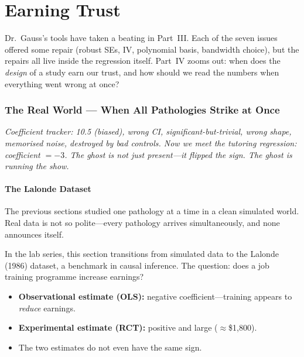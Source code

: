 \documentclass[11pt,a4paper]{article}
\theoremstyle{definition}
\theoremstyle{plain}
\theoremstyle{remark}
\begin{document}
\part{Earning Trust}\label{part:trust}

Dr.\ Gauss's tools have taken a beating in Part~III. Each of the seven issues offered some repair (robust SEs, IV, polynomial basis, bandwidth choice), but the repairs all live inside the regression itself. Part~IV zooms out: when does the \emph{design} of a study earn our trust, and how should we read the numbers when everything went wrong at once?

\section{The Real World --- When All Pathologies Strike at Once}\label{sec:realworld}

\noindent\textit{Coefficient tracker: 10.5 (biased), wrong CI, significant-but-trivial, wrong shape, memorised noise, destroyed by bad controls. Now we meet the tutoring regression: coefficient $= -3$. The ghost is not just present---it flipped the sign. The ghost is running the show.}

\subsection{The Lalonde Dataset}

The previous sections studied one pathology at a time in a clean simulated world. Real data is not so polite---every pathology arrives simultaneously, and none announces itself.

In the lab series, this section transitions from simulated data to the Lalonde (1986) dataset, a benchmark in causal inference.
The question: does a job training programme increase earnings?

\begin{itemize}[nosep]
  \item \textbf{Observational estimate (OLS):} negative coefficient---training appears to \emph{reduce} earnings.
  \item \textbf{Experimental estimate (RCT):} positive and large ($\approx$\$1{,}800).
  \item The two estimates do not even have the same sign.
\end{itemize}
\end{document}
